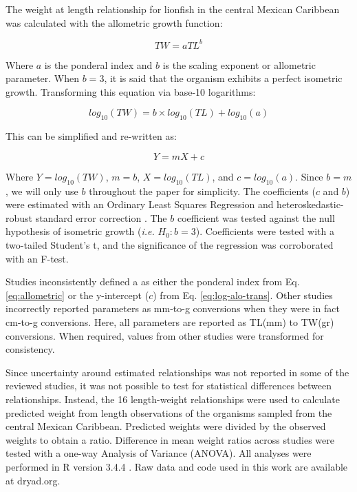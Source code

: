 \documentclass[fleqn,10pt,lineno]{wlpeerj} %
\begin{document}
The weight at length relationship for lionfish in the central Mexican
Caribbean was calculated with the allometric growth function:

\begin{equation}
\label{eq:allometric}
TW = aTL^b
\end{equation}

Where \(a\) is the ponderal index and \(b\) is the scaling exponent or
allometric parameter. When \(b = 3\), it is said that the organism
exhibits a perfect isometric growth. Transforming this equation via
base-10 logarithms:

\begin{equation}
\label{eq:log-alo}
log_{10}(TW) = b\times log_{10}(TL) + log_{10}(a)
\end{equation}

This can be simplified and re-written as:

\begin{equation}
\label{eq:log-alo-trans}
Y = mX + c
\end{equation}

Where \(Y = log_{10}(TW)\), \(m = b\), \(X = log_{10}(TL)\), and
\(c = log_{10}(a)\). Since \(b = m\), we will only use \(b\) throughout
the paper for simplicity. The coefficients (\(c\) and \(b\)) were
estimated with an Ordinary Least Squares Regression and
heteroskedastic-robust standard error correction \citep{zeileis_2004}.
The \(b\) coefficient was tested against the null hypothesis of
isometric growth (\emph{i.e.} \(H_0: b = 3\)). Coefficients were tested
with a two-tailed Student's t, and the significance of the regression
was corroborated with an F-test.

Studies inconsistently defined a as either the ponderal index from Eq.
\ref{eq:allometric} or the y-intercept (\(c\)) from Eq.
\ref{eq:log-alo-trans}. Other studies incorrectly reported parameters as
mm-to-g conversions when they were in fact cm-to-g conversions. Here,
all parameters are reported as TL(mm) to TW(gr) conversions. When
required, values from other studies were transformed for consistency.

Since uncertainty around estimated relationships was not reported in
some of the reviewed studies, it was not possible to test for
statistical differences between relationships. Instead, the 16
length-weight relationships were used to calculate predicted weight from
length observations of the organisms sampled from the central Mexican
Caribbean. Predicted weights were divided by the observed weights to
obtain a ratio. Difference in mean weight ratios across studies were
tested with a one-way Analysis of Variance (ANOVA). All analyses were
performed in R version 3.4.4 \citep{rcore_2018}. Raw data and code used
in this work are available at dryad.org.
\end{document}
